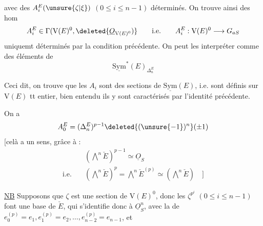 avec des $A_i^E(\unsure{\zeta|\xi})$ $(0\leq i\leq n-1)$  déterminés.
On trouve ainsi des hom
\[
 A_i^E\in\Gamma(\mathrm V(E)^0,\deleted{\underline O_{\mathrm V(E)^0})}
 \qquad\text{i.e.}\qquad A_i^E:\mathrm V(E)^0\longrightarrow G_{aS}
\]
uniquemt déterminés par la condition précédente.
On peut les interpréter comme des éléments de
\[
 \underline{\mathrm{Sym}}^*(E)_{\Delta_n^E}
\]

Ceci dit, on trouve que les $A_i$ sont des sections de $\underline{\mathrm{Sym}}(E)$, i.e. sont définis sur
$\mathrm V(E)$ tt entier, bien entendu ils y sont caractérisés par l'identité précédente.

On a 
\[
 A_0^E=(\Delta_n^E)^{p-1}\deleted{(\unsure{-1})^n}(\pm1)
\]
[celà a un sens, grâce à :
\[
 \begin{aligned}
 &(\textstyle\bigwedge^n\check E)^{p-1}\simeq\underline O_S\\
 \text{i.e.}\quad&(\textstyle\bigwedge^n\check E)^p=\textstyle\bigwedge^n\check E^{(p)}\simeq
 (\textstyle\bigwedge^n\check E)\quad\big]
 \end{aligned}
\]

\uline{NB} Supposons que $\zeta$ est une section de $\mathrm V(E)^0$, 
donc les $\zeta^{p^i}$ $(0\leq i\leq n-1)$ font une base de $\check E$, qui s'identifie donc à
$\underline O_S^{n}$, avec la  de  
$e_0^{(p)}=e_1,e_1^{(p)}=e_2,\ldots,e_{n-2}^{(p)}=e_{n-1}$, et
